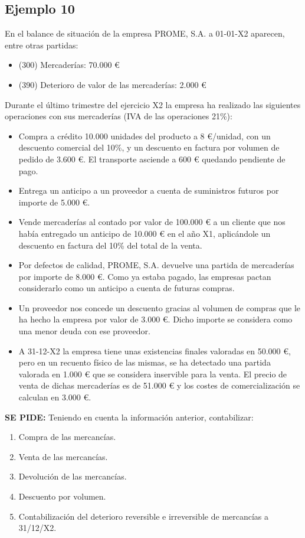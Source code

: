 \documentclass{article}
\begin{document}
\subsection{Ejemplo 10}

En el balance de situación de la empresa PROME, S.A. a 01-01-X2 aparecen, entre otras partidas:

\begin{itemize}
    \item (300) Mercaderías: 70.000 €
    \item (390) Deterioro de valor de las mercaderías: 2.000 €
\end{itemize}

Durante el último trimestre del ejercicio X2 la empresa ha realizado las siguientes operaciones con sus mercaderías (IVA de las operaciones 21\%):

\begin{itemize}
    \item Compra a crédito 10.000 unidades del producto a 8 €/unidad, con un descuento comercial del 10\%, y un descuento en factura por volumen de pedido de 3.600 €. El transporte asciende a 600 € quedando pendiente de pago.
    \item Entrega un anticipo a un proveedor a cuenta de suministros futuros por importe de 5.000 €.
    \item Vende mercaderías al contado por valor de 100.000 € a un cliente que nos había entregado un anticipo de 10.000 € en el año X1, aplicándole un descuento en factura del 10\% del total de la venta.
    \item Por defectos de calidad, PROME, S.A. devuelve una partida de mercaderías por importe de 8.000 €. Como ya estaba pagado, las empresas pactan considerarlo como un anticipo a cuenta de futuras compras.
    \item Un proveedor nos concede un descuento gracias al volumen de compras que le ha hecho la empresa por valor de 3.000 €. Dicho importe se considera como una menor deuda con ese proveedor.
    \item A 31-12-X2 la empresa tiene unas existencias finales valoradas en 50.000 €, pero en un recuento físico de las mismas, se ha detectado una partida valorada en 1.000 € que se considera inservible para la venta. El precio de venta de dichas mercaderías es de 51.000 € y los costes de comercialización se calculan en 3.000 €.
\end{itemize}

\textbf{SE PIDE:} Teniendo en cuenta la información anterior, contabilizar:
\begin{enumerate}
    \item Compra de las mercancías.
    \item Venta de las mercancías.
    \item Devolución de las mercancías.
    \item Descuento por volumen.
    \item Contabilización del deterioro reversible e irreversible de mercancías a 31/12/X2.
\end{enumerate}
\end{document}
